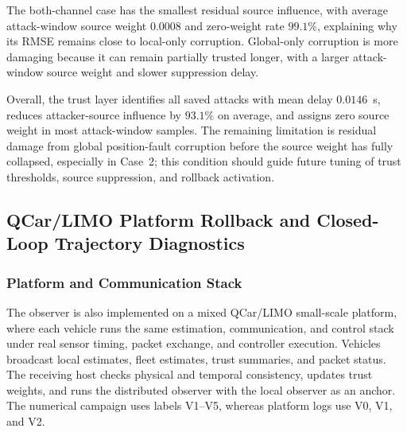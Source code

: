 \documentclass[letterpaper,journal]{IEEEtran}
\begin{document}
The both-channel case has the smallest residual source influence, with average attack-window source weight $0.0008$ and zero-weight rate $99.1\%$, explaining why its RMSE remains close to local-only corruption. Global-only corruption is more damaging because it can remain partially trusted longer, with a larger attack-window source weight and slower suppression delay.

Overall, the trust layer identifies all saved attacks with mean delay $0.0146$~s, reduces attacker-source influence by $93.1\%$ on average, and assigns zero source weight in most attack-window samples. The remaining limitation is residual damage from global position-fault corruption before the source weight has fully collapsed, especially in Case~2; this condition should guide future tuning of trust thresholds, source suppression, and rollback activation.



\subsection{QCar/LIMO Platform Rollback and Closed-Loop Trajectory Diagnostics}\label{sec:qcar_limo_platform}

\subsubsection{Platform and Communication Stack}

The observer is also implemented on a mixed QCar/LIMO small-scale platform, where each vehicle runs the same estimation, communication, and control stack under real sensor timing, packet exchange, and controller execution. Vehicles broadcast local estimates, fleet estimates, trust summaries, and packet status. The receiving host checks physical and temporal consistency, updates trust weights, and runs the distributed observer with the local observer as an anchor. The numerical campaign uses labels V1--V5, whereas platform logs use V0, V1, and V2.
\end{document}
